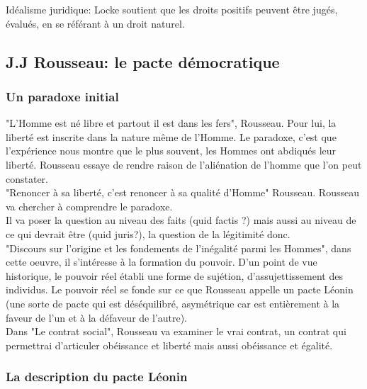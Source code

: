 \documentclass[10pt, a4paper, openany]{book}
\begin{document}
Idéalisme juridique: Locke soutient que les droits positifs peuvent être jugés, évalués, en se référant à un droit naturel. 

\subsection{J.J Rousseau: le pacte démocratique}

\subsubsection{Un paradoxe initial}

"L'Homme est né libre et partout il est dans les fers", Rousseau. Pour lui, la liberté est inscrite dans la nature même de l'Homme. Le paradoxe, c'est que l'expérience nous montre que le plus souvent, les Hommes ont abdiqués leur liberté. Rousseau essaye de rendre raison de l'aliénation de l'homme que l'on peut constater. \\
"Renoncer à sa liberté, c'est renoncer à sa qualité d'Homme" Rousseau. Rousseau va chercher à comprendre le paradoxe. \\
Il va poser la question au niveau des faits (quid factis ?) mais aussi au niveau de ce qui devrait être (quid juris?), la question de la légitimité donc. \\
"Discours sur l'origine et les fondements de l'inégalité parmi les Hommes", dans cette oeuvre, il s'intéresse à la formation du pouvoir. D'un point de vue historique, le pouvoir réel établi une forme de sujétion, d'assujettissement des individus. Le pouvoir réel se fonde sur ce que Rousseau appelle un pacte Léonin (une sorte de pacte qui est déséquilibré, asymétrique car est entièrement à la faveur de l'un et à la défaveur de l'autre). \\
Dans "Le contrat social", Rousseau va examiner le vrai contrat, un contrat qui permettrai d'articuler obéissance et liberté mais aussi obéissance et égalité. 

\subsubsection{La description du pacte Léonin}
\end{document}
